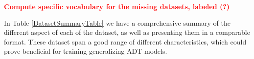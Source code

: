 \textcolor{red}{\textbf{Compute specific vocabulary for the missing datasets, labeled (?)}}

In Table \ref{DatasetSummaryTable} we have a comprehensive summary of the different aspect of each of the dataset, as well as presenting them in a comparable format. These dataset span a good range of different characteristics, which could prove beneficial for training generalizing \gls{ADT} models.